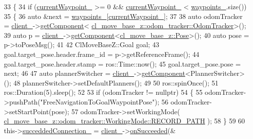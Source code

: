 \begin{DoxyCode}
33 \{
34   \textcolor{keywordflow}{if} (\hyperlink{classcl__move__base__z_1_1WaypointNavigator_a82859e418592c2392c20a2d11b9836eb}{currentWaypoint\_} >= 0 && \hyperlink{classcl__move__base__z_1_1WaypointNavigator_a82859e418592c2392c20a2d11b9836eb}{currentWaypoint\_} < 
      \hyperlink{classcl__move__base__z_1_1WaypointNavigator_a727f6a73e15ff5dc6bb3ffdf52c3d832}{waypoints\_}.size())
35   \{
36     \textcolor{keyword}{auto} &next = \hyperlink{classcl__move__base__z_1_1WaypointNavigator_a727f6a73e15ff5dc6bb3ffdf52c3d832}{waypoints\_}[\hyperlink{classcl__move__base__z_1_1WaypointNavigator_a82859e418592c2392c20a2d11b9836eb}{currentWaypoint\_}];
37 
38     \textcolor{keyword}{auto} odomTracker = \hyperlink{classcl__move__base__z_1_1WaypointNavigator_afc5ad5c5d15f41437286b8fca1d3a324}{client\_}->\hyperlink{classsmacc_1_1ISmaccClient_adef78db601749ca63c19e74a27cb88cc}{getComponent}<
      \hyperlink{classcl__move__base__z_1_1odom__tracker_1_1OdomTracker}{cl\_move\_base\_z::odom\_tracker::OdomTracker}>();
39     \textcolor{keyword}{auto} p = \hyperlink{classcl__move__base__z_1_1WaypointNavigator_afc5ad5c5d15f41437286b8fca1d3a324}{client\_}->\hyperlink{classsmacc_1_1ISmaccClient_adef78db601749ca63c19e74a27cb88cc}{getComponent}<\hyperlink{classcl__move__base__z_1_1Pose}{cl\_move\_base\_z::Pose}>();
40     \textcolor{keyword}{auto} pose = p->toPoseMsg();
41 
42     ClMoveBaseZ::Goal goal;
43     goal.target\_pose.header.frame\_id = p->getReferenceFrame();
44     goal.target\_pose.header.stamp = ros::Time::now();
45     goal.target\_pose.pose = next;
46 
47     \textcolor{keyword}{auto} plannerSwitcher = \hyperlink{classcl__move__base__z_1_1WaypointNavigator_afc5ad5c5d15f41437286b8fca1d3a324}{client\_}->\hyperlink{classsmacc_1_1ISmaccClient_adef78db601749ca63c19e74a27cb88cc}{getComponent}<PlannerSwitcher>();
48     plannerSwitcher->setDefaultPlanners();
49 
50     ros::spinOnce();
51     ros::Duration(5).sleep();
52 
53     \textcolor{keywordflow}{if} (odomTracker != \textcolor{keyword}{nullptr})
54     \{
55       odomTracker->pushPath(\textcolor{stringliteral}{"FreeNavigationToGoalWaypointPose"});
56       odomTracker->setStartPoint(pose);
57       odomTracker->setWorkingMode(
      \hyperlink{namespacecl__move__base__z_1_1odom__tracker_ac46b05813b2791604f6cd0a39ace3ef8a023bc3adf68871ef7a0c616765ac80a7}{cl\_move\_base\_z::odom\_tracker::WorkingMode::RECORD\_PATH}
      );
58     \}
59 
60     this->\hyperlink{classcl__move__base__z_1_1WaypointNavigator_a6e32b1d6cae56963187d0965de251108}{succeddedConnection\_} = \hyperlink{classcl__move__base__z_1_1WaypointNavigator_afc5ad5c5d15f41437286b8fca1d3a324}{client\_}->\hyperlink{classsmacc_1_1client__bases_1_1SmaccActionClientBase_af6d77c27d21b2e4f621f53c5f1df088b}{onSucceeded}(&

\end{DoxyCode}
